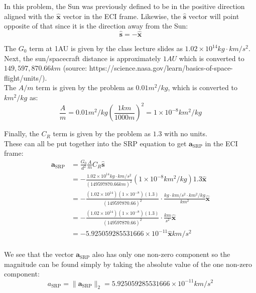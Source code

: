 \documentclass[titlepage]{article}
\begin{document}
In this problem, the Sun was previously defined to be in the positive direction aligned with the $\hat{\boldsymbol{x}}$ vector in the ECI frame. Likewise, the $\hat{\boldsymbol{s}}$ vector will point opposite of that since it is the direction away from the Sun:
\begin{equation}
	\hat{\boldsymbol{s}}=-\hat{\boldsymbol{x}}
\end{equation}

The $G_0$ term at 1AU is given by the class lecture slides as $1.02\times10^{14}kg\cdot km/s^2$.\\

Next, the sun/spacecraft distance is approximately $1AU$ which is converted to $149,597,870.66 km$ (source: https://science.nasa.gov/learn/basics-of-space-flight/units/).\\

The $A/m$ term is given by the problem as $0.01m^2/kg$, which is converted to $km^2/kg$ as:
\begin{equation}
	\frac{A}{m}=0.01m^2/kg\left(\frac{1km}{1000m}\right)^2=1\times10^{-8}km^2/kg
\end{equation}

Finally, the $C_R$ term is given by the problem as $1.3$ with no units.\\

These can all be put together into the SRP equation to get $\boldsymbol{a}_{\text{SRP}}$ in the ECI frame:
\begin{equation}
	\begin{split}
		\boldsymbol{a}_{\text{SRP}}&=\frac{G_0}{d^2}\frac{A}{m}C_R\hat{\boldsymbol{s}}\\
		&=-\frac{1.02\times10^{14}kg\cdot km/s^2}{(149597870.66 km)^2}(1\times10^{-8}km^2/kg)1.3\hat{\boldsymbol{x}}\\
		&=-\frac{(1.02\times10^{14})(1\times10^{-8})(1.3)}{(149597870.66)^2}\cdot\frac{kg\cdot km/s^2\cdot km^2/kg}{km^2}\hat{\boldsymbol{x}}\\
		&=-\frac{(1.02\times10^{14})(1\times10^{-8})(1.3)}{(149597870.66)^2}\cdot\frac{km}{s^2}\hat{\boldsymbol{x}}\\
		&=-5.925059285531666\times10^{-11}\hat{\boldsymbol{x}}km/s^2\\
	\end{split}
\end{equation}

\begin{mdframed}[linewidth=1pt, innertopmargin=10pt, innerbottommargin=10pt]
	We see that the vector $\boldsymbol{a}_\text{SRP}$ also has only one non-zero component so the magnitude can be found simply by taking the absolute value of the one non-zero component:
	\begin{equation}
		a_\text{SRP} = \|\boldsymbol{a}_\text{SRP}\|_2=5.925059285531666\times10^{-11}km/s^2
	\end{equation}
\end{mdframed}
\end{document}
